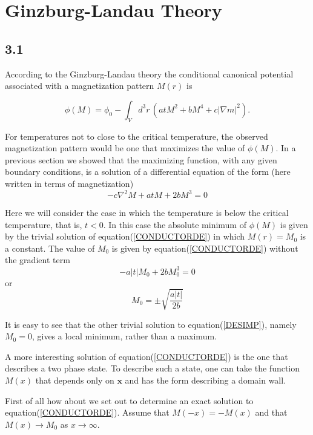 \documentclass[10pt,twoside,openright]{memoir}
\begin{document}
\section{Ginzburg-Landau Theory}

\subsection{3.1}
According to the Ginzburg-Landau theory the conditional canonical potential associated with a magnetization pattern $M(r)$ is

\begin{equation}
\phi(M) = \phi_0 - \int_V d^3r \, \left( atM^2 + bM^4 + c|\nabla m|^2  \right).
\end{equation}

For temperatures not to close to the critical temperature, the observed magnetization pattern would be one that maximizes the value of $\phi(M)$. In a previous section we showed that the maximizing function, with any given boundary conditions, is a solution of a differential equation of the form (here written in terms of magnetization)
\begin{equation}\label{CONDUCTORDE}
-c \nabla ^2 M + atM + 2bM^3 = 0
\end{equation}

Here we will consider the case in which the temperature is below the critical temperature, that is, $t<0$. In this case the absolute minimum of $\phi(M)$ is given by the trivial solution of equation(\ref{CONDUCTORDE}) in which $M(r)=M_0$ is a constant. The value of $M_0$ is given by equation(\ref{CONDUCTORDE}) without the gradient term
\begin{equation}\label{DESIMP}
-a|t|M_0 + 2bM^{3}_{0} = 0
\end{equation}
or
\begin{equation}
M_0 = \pm \sqrt{\frac{a|t|}{2b}}
\end{equation}

It is easy to see that the other trivial solution to equation(\ref{DESIMP}), namely $M_0 = 0$, gives a local minimum, rather than a maximum.

A more interesting solution of equation(\ref{CONDUCTORDE}) is the one that describes a two phase state. To describe such a state, one can take the function $M(x)$ that depends only on $\textbf{x}$ and has the form describing a domain wall.

First of all how about we set out to determine an exact solution to equation(\ref{CONDUCTORDE}). Assume that $M(-x)= -M(x)$ and that $M(x) \rightarrow M_0$ as $x \rightarrow \infty 
$.
\end{document}

